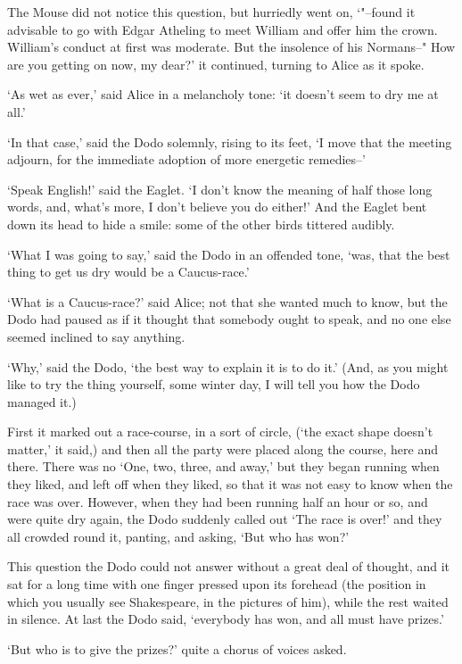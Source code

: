 \documentclass[statementpaper,twoside,openany]{memoir}
\begin{document}
The Mouse did not notice this question, but hurriedly went on, `"--found it advisable to go with Edgar Atheling to meet William and offer him the crown. William's conduct at first was moderate. But the insolence of his Normans--" How are you getting on now, my dear?' it continued, turning to Alice as it spoke.

`As wet as ever,' said Alice in a melancholy tone: `it doesn't seem to dry me at all.'

`In that case,' said the Dodo solemnly, rising to its feet, `I move that the meeting adjourn, for the immediate adoption of more energetic remedies--'

`Speak English!' said the Eaglet. `I don't know the meaning of half those long words, and, what's more, I don't believe you do either!' And the Eaglet bent down its head to hide a smile: some of the other birds tittered audibly.

`What I was going to say,' said the Dodo in an offended tone, `was, that the best thing to get us dry would be a Caucus-race.'

`What is a Caucus-race?' said Alice; not that she wanted much to know, but the Dodo had paused as if it thought that somebody ought to speak, and no one else seemed inclined to say anything.

`Why,' said the Dodo, `the best way to explain it is to do it.' (And, as you might like to try the thing yourself, some winter day, I will tell you how the Dodo managed it.)

First it marked out a race-course, in a sort of circle, (`the exact shape doesn't matter,' it said,) and then all the party were placed along the course, here and there. There was no `One, two, three, and away,' but they began running when they liked, and left off when they liked, so that it was not easy to know when the race was over. However, when they had been running half an hour or so, and were quite dry again, the Dodo suddenly called out `The race is over!' and they all crowded round it, panting, and asking, `But who has won?'

This question the Dodo could not answer without a great deal of thought, and it sat for a long time with one finger pressed upon its forehead (the position in which you usually see Shakespeare, in the pictures of him), while the rest waited in silence. At last the Dodo said, `everybody has won, and all must have prizes.'

`But who is to give the prizes?' quite a chorus of voices asked.
\end{document}

